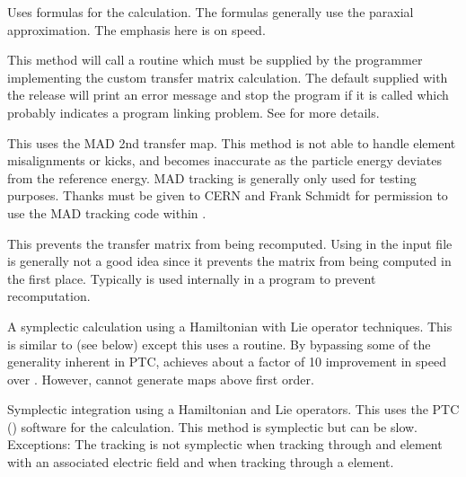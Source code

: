 \begin{description}

\item[\vn{Bmad_Standard}]
Uses formulas for the calculation. The formulas generally use the paraxial approximation. The
emphasis here is on speed.

\item[\vn{Custom}]
This method will call a routine  which must be supplied by the programmer
implementing the custom transfer matrix calculation. The default  supplied with
the \bmad release will print an error message and stop the program if it is called which probably
indicates a program linking problem.  See  for more details.

\item[\vn{MAD}]
This uses the MAD 2nd transfer map. This method is not able to handle element misalignments or
kicks, and becomes inaccurate as the particle energy deviates from the reference energy. MAD
tracking is generally only used for testing purposes. Thanks must be given to CERN and Frank Schmidt
for permission to use the MAD tracking code within \bmad.

\item[\vn{Static}]
This prevents the transfer matrix from being recomputed.  Using  in the input file is
generally not a good idea since it prevents the matrix from being computed in the first place.
Typically  is used internally in a program to prevent recomputation.

\item[\vn{Symp_Lie_Bmad}]
A symplectic calculation using a Hamiltonian with Lie operator techniques.  This is similar to
 (see below) except this uses a \bmad routine. By bypassing some of the generality
inherent in PTC,  achieves about a factor of 10 improvement in speed over
. However,  cannot generate maps above first order.

\item[\vn{Symp_Lie_PTC}]
Symplectic integration using a Hamiltonian and Lie operators.  This uses the PTC
() software for the calculation.  This method is symplectic but can be
slow. Exceptions: The tracking is not symplectic when tracking through and element with an
associated electric field and when tracking through a  element.


\end{description}
